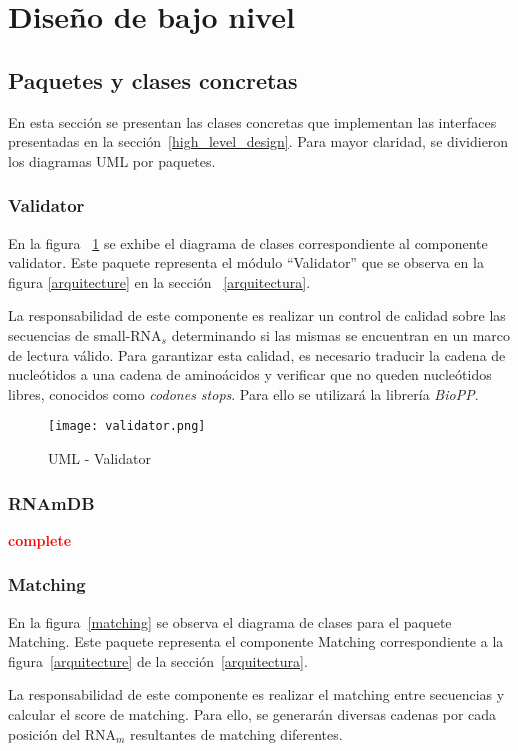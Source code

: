 \section{Diseño de bajo nivel}
\label{low_level_design}

\subsection{Paquetes y clases concretas}
En esta sección se presentan las clases concretas que implementan las interfaces presentadas en la 
sección~\ref{high_level_design}. Para mayor claridad, se dividieron los diagramas UML por paquetes.

\subsubsection{Validator}
\par En la figura ~\ref{validator} se exhibe el diagrama de clases correspondiente al componente \textsf{validator}. Este paquete representa el módulo ``Validator'' que se observa en la figura \ref{arquitecture} en la sección ~\ref{arquitectura}.

\par La responsabilidad de este componente es realizar un control de calidad sobre las secuencias de small-RNA$_s$ determinando si las mismas se encuentran en un marco de lectura válido. Para garantizar esta calidad, es necesario traducir la cadena de nucleótidos a una cadena de aminoácidos y verificar que no queden nucleótidos libres, conocidos como \emph{codones stops}. Para ello se utilizará la librería \emph{BioPP}.

\begin{figure}[!hbtp]
	\begin{center}
		\texttt{[image: validator.png]}
		\caption{UML - Validator}
		\label{validator}
	\end{center}
\end{figure}

\subsubsection{RNAmDB}
	\textcolor{red}{\textbf{complete}}

\subsubsection{Matching}
\par En la figura~\ref{matching} se observa el diagrama de clases para el paquete \textsf{Matching}. Este paquete representa el componente \textsf{Matching} correspondiente a la figura~\ref{arquitecture} de la sección~\ref{arquitectura}.
\par La responsabilidad de este componente es realizar el matching entre secuencias y calcular el score de matching. Para ello, se generarán diversas cadenas por cada posición del RNA$_m$ resultantes de matching diferentes. 

